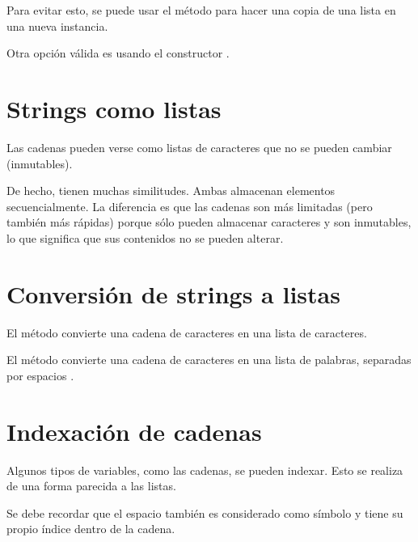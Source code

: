 Para evitar esto, se puede usar el método  para hacer una copia de una lista en una nueva instancia.


Otra opción válida es usando el constructor .


\section{Strings como listas}

Las cadenas pueden verse como listas de caracteres que no se pueden cambiar (inmutables).


De hecho, tienen muchas similitudes.
Ambas almacenan elementos secuencialmente.
La diferencia es que las cadenas son más limitadas (pero también más rápidas) porque sólo pueden almacenar caracteres y son inmutables, lo que significa que sus contenidos no se pueden alterar.

\section{Conversión de strings a listas}

El método  convierte una cadena de caracteres en una lista de caracteres.


El método  convierte una cadena de caracteres en una lista de palabras, separadas por espacios \ttt{\qq  \qq}.


\section{Indexación de cadenas}

Algunos tipos de variables, como las cadenas, se pueden indexar. Esto se realiza de una forma parecida a las listas.


Se debe recordar que el espacio \ttt{\qq  \qq} también es considerado como símbolo y tiene su propio índice dentro de la cadena.

